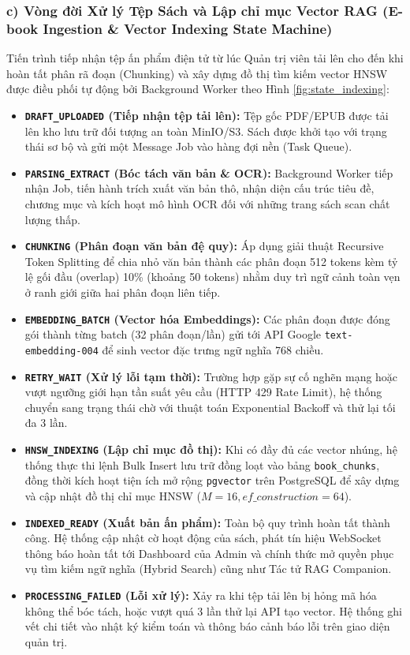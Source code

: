 \documentclass[11pt, a4paper]{report}
\begin{document}
\subsubsection{c) Vòng đời Xử lý Tệp Sách và Lập chỉ mục Vector RAG (E-book Ingestion \& Vector Indexing State Machine)}

Tiến trình tiếp nhận tệp ấn phẩm điện tử từ lúc Quản trị viên tải lên cho đến khi hoàn tất phân rã đoạn (Chunking) và xây dựng đồ thị tìm kiếm vector HNSW được điều phối tự động bởi Background Worker theo Hình \ref{fig:state_indexing}:
\begin{itemize}
    \item \textbf{\texttt{DRAFT\_UPLOADED} (Tiếp nhận tệp tải lên):} Tệp gốc PDF/EPUB được tải lên kho lưu trữ đối tượng an toàn MinIO/S3. Sách được khởi tạo với trạng thái sơ bộ và gửi một Message Job vào hàng đợi nền (Task Queue).
    \item \textbf{\texttt{PARSING\_EXTRACT} (Bóc tách văn bản \& OCR):} Background Worker tiếp nhận Job, tiến hành trích xuất văn bản thô, nhận diện cấu trúc tiêu đề, chương mục và kích hoạt mô hình OCR đối với những trang sách scan chất lượng thấp.
    \item \textbf{\texttt{CHUNKING} (Phân đoạn văn bản đệ quy):} Áp dụng giải thuật Recursive Token Splitting để chia nhỏ văn bản thành các phân đoạn 512 tokens kèm tỷ lệ gối đầu (overlap) 10\% (khoảng 50 tokens) nhằm duy trì ngữ cảnh toàn vẹn ở ranh giới giữa hai phân đoạn liên tiếp.
    \item \textbf{\texttt{EMBEDDING\_BATCH} (Vector hóa Embeddings):} Các phân đoạn được đóng gói thành từng batch (32 phân đoạn/lần) gửi tới API Google \texttt{text-embedding-004} để sinh vector đặc trưng ngữ nghĩa 768 chiều.
    \item \textbf{\texttt{RETRY\_WAIT} (Xử lý lỗi tạm thời):} Trường hợp gặp sự cố nghẽn mạng hoặc vượt ngưỡng giới hạn tần suất yêu cầu (HTTP 429 Rate Limit), hệ thống chuyển sang trạng thái chờ với thuật toán Exponential Backoff và thử lại tối đa 3 lần.
    \item \textbf{\texttt{HNSW\_INDEXING} (Lập chỉ mục đồ thị):} Khi có đầy đủ các vector nhúng, hệ thống thực thi lệnh Bulk Insert lưu trữ đồng loạt vào bảng \texttt{book\_chunks}, đồng thời kích hoạt tiện ích mở rộng \texttt{pgvector} trên PostgreSQL để xây dựng và cập nhật đồ thị chỉ mục HNSW ($M=16, ef\_construction=64$).
    \item \textbf{\texttt{INDEXED\_READY} (Xuất bản ấn phẩm):} Toàn bộ quy trình hoàn tất thành công. Hệ thống cập nhật cờ hoạt động của sách, phát tín hiệu WebSocket thông báo hoàn tất tới Dashboard của Admin và chính thức mở quyền phục vụ tìm kiếm ngữ nghĩa (Hybrid Search) cũng như Tác tử RAG Companion.
    \item \textbf{\texttt{PROCESSING\_FAILED} (Lỗi xử lý):} Xảy ra khi tệp tải lên bị hỏng mã hóa không thể bóc tách, hoặc vượt quá 3 lần thử lại API tạo vector. Hệ thống ghi vết chi tiết vào nhật ký kiểm toán và thông báo cảnh báo lỗi trên giao diện quản trị.
\end{itemize}
\end{document}
